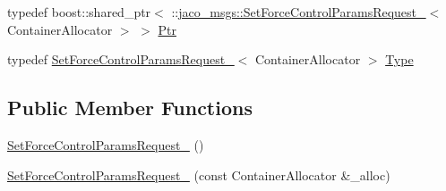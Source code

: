 \begin{DoxyCompactItemize}
\item 
typedef boost\+::shared\+\_\+ptr$<$ \+::\hyperlink{structjaco__msgs_1_1SetForceControlParamsRequest__}{jaco\+\_\+msgs\+::\+Set\+Force\+Control\+Params\+Request\+\_\+}$<$ Container\+Allocator $>$ $>$ \hyperlink{structjaco__msgs_1_1SetForceControlParamsRequest___a6f9103b3c32ab4166e19d1380abd2341}{Ptr}
\item 
typedef \hyperlink{structjaco__msgs_1_1SetForceControlParamsRequest__}{Set\+Force\+Control\+Params\+Request\+\_\+}$<$ Container\+Allocator $>$ \hyperlink{structjaco__msgs_1_1SetForceControlParamsRequest___a68a11fb0d92ae57132efabb6443b4df7}{Type}
\end{DoxyCompactItemize}
\subsection*{Public Member Functions}
\begin{DoxyCompactItemize}
\item 
\hyperlink{structjaco__msgs_1_1SetForceControlParamsRequest___a49ff77a144d175d9eec07a86b2991d97}{Set\+Force\+Control\+Params\+Request\+\_\+} ()
\item 
\hyperlink{structjaco__msgs_1_1SetForceControlParamsRequest___adaad20b373b37b06d5ee26ac8b243ede}{Set\+Force\+Control\+Params\+Request\+\_\+} (const Container\+Allocator \&\+\_\+alloc)
\end{DoxyCompactItemize}
